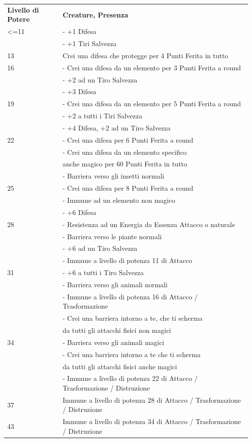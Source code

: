 \documentclass[a4paper,11pt,twoside,openany]{book}
\begin{document}
\begin{tabular}{L{3cm} L{13cm}}
\toprule
\textbf{Livello di Potere} & \textbf{Creature, Presenza}\tabularnewline
<=11 & - +1 Difesa\\
& - +1 Tiri Salvezza \\
13 & Crei una difesa che protegge per 4 Punti Ferita in tutto \\
16 & - Crei una difesa da un elemento per 3 Punti Ferita a round \\
& - +2 ad un Tiro Salvezza\\
& - +3 Difesa\\
19 & - Crei una difesa da un elemento per 5 Punti Ferita a round\\
& - +2 a tutti i Tiri Salvezza\\
& - +4 Difesa, +2 ad un Tiro Salvezza\\
22 &- Crei una difesa per 6 Punti Ferita a round\\
& - Crei una difesa da un elemento specifico\\
&anche magico per 60 Punti Ferita in tutto\\
& - Barriera verso gli insetti normali\\
25 &- Crei una difesa per 8 Punti Ferita a round\\
&- Immune ad un elemento non magico\\
&- +6 Difesa\\
28 &- Resistenza ad un Energia da Essenza Attacco o naturale\\
&- Barriera verso le piante normali\\
&- +6 ad un Tiro Salvezza\\
&- Immune a livello di potenza 11 di Attacco\\
31 &- +6 a tutti i Tiro Salvezza\\
&- Barriera verso gli animali normali\\
&- Immune a livello di potenza 16 di Attacco / Trasformazione\\
&- Crei una barriera intorno a te, che ti scherma\\
& da tutti gli attacchi fisici non magici\\
34 &- Barriera verso gli animali magici\\
&- Crei una barriera intorno a te che ti scherma\\
&da tutti gli attacchi fisici anche magici\\
&- Immune a livello di potenza 22 di Attacco / Trasformazione / Distruzione\\
37 &Immune a livello di potenza 28 di Attacco / Trasformazione / Distruzione\\
43 &Immune a livello di potenza 34 di Attacco / Trasformazione / Distruzione\\
\end{tabular}
\end{document}
